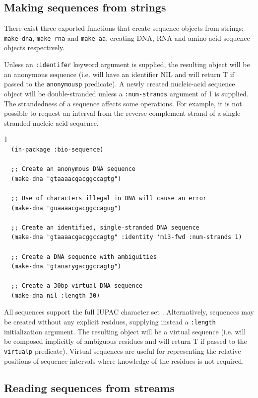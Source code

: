 \documentclass[a4paper, 12pt]{article}
\begin{document}
\subsection{Making sequences from strings}
\label{sec:make-bioseq-str}

There exist three exported functions that create sequence objects from
strings; \lstinline!make-dna!, \lstinline!make-rna! and
\lstinline!make-aa!, creating DNA, RNA and amino-acid sequence objects
respectively.

Unless an \lstinline!:identifer! keyword argument is supplied, the
resulting object will be an anonymous sequence (i.e. will have an
identifier NIL and will return T if passed to the
\lstinline!anonymousp! predicate). A newly created nucleic-acid
sequence object will be double-stranded unless a
\lstinline!:num-strands! argument of 1 is supplied. The strandedness
of a sequence affects some operations. For example, it is not possible
to request an interval from the reverse-complement strand of a
single-stranded nucleic acid sequence.

\begin{lstlisting}[caption={Making DNA sequences from strings},
  label=lst:make-dnaseq-string,float=[tbph]]
  (in-package :bio-sequence)
  
  ;; Create an anonymous DNA sequence
  (make-dna "gtaaaacgacggccagtg")
  
  ;; Use of characters illegal in DNA will cause an error
  (make-dna "guaaaacgacggccagug")

  ;; Create an identified, single-stranded DNA sequence 
  (make-dna "gtaaaacgacggccagtg" :identity 'm13-fwd :num-strands 1)

  ;; Create a DNA sequence with ambiguities
  (make-dna "gtanarygacggccagtg")

  ;; Create a 30bp virtual DNA sequence
  (make-dna nil :length 30)
\end{lstlisting}

All sequences support the full IUPAC character set
\cite{PMID:2582368}. Alternatively, sequences may be created without
any explicit residues, supplying instead a \lstinline!:length!
initialization argument. The resulting object will be a virtual
sequence (i.e. will be composed implicitly of ambiguous residues and
will return T if passed to the \lstinline!virtualp!
predicate). Virtual sequences are useful for representing the relative
positions of sequence intervals where knowledge of the residues is not
required.

\subsection{Reading sequences from streams}
\label{sec:read-bioseq-stream}
\end{document}
